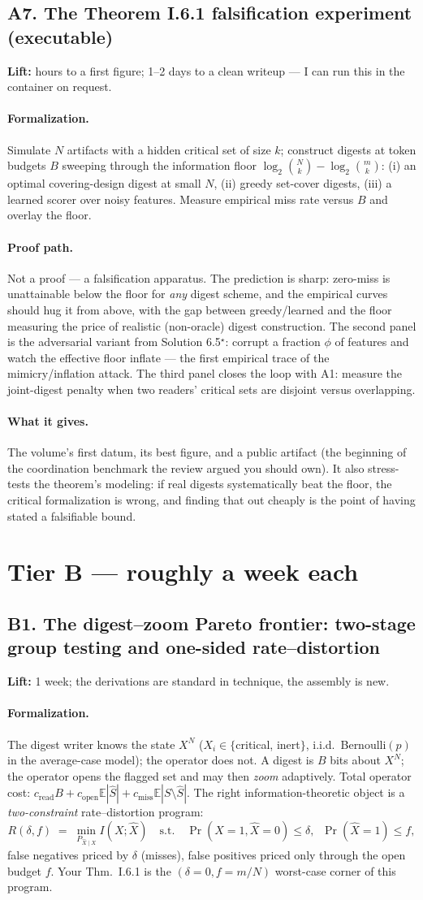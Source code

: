 \documentclass[11pt,a4paper]{article}
\newcommand{\lift}[1]{\noindent\textbf{Lift:} #1.}
\newcommand{\gives}{\paragraph{What it gives.}}
\newcommand{\form}{\paragraph{Formalization.}}
\newcommand{\proofpath}{\paragraph{Proof path.}}
\begin{document}
\subsection{A7. The Theorem I.6.1 falsification experiment (executable)}
\lift{hours to a first figure; 1--2 days to a clean writeup --- I can run this in the container on request}

\form Simulate $N$ artifacts with a hidden critical set of size $k$; construct digests at token budgets $B$ sweeping through the information floor $\log_2\binom{N}{k} - \log_2\binom{m}{k}$: (i) an optimal covering-design digest at small $N$, (ii) greedy set-cover digests, (iii) a learned scorer over noisy features. Measure empirical miss rate versus $B$ and overlay the floor.

\proofpath Not a proof --- a falsification apparatus. The prediction is sharp: zero-miss is unattainable below the floor for \emph{any} digest scheme, and the empirical curves should hug it from above, with the gap between greedy/learned and the floor measuring the price of realistic (non-oracle) digest construction. The second panel is the adversarial variant from Solution 6.5$^\star$: corrupt a fraction $\phi$ of features and watch the effective floor inflate --- the first empirical trace of the mimicry/inflation attack. The third panel closes the loop with A1: measure the joint-digest penalty when two readers' critical sets are disjoint versus overlapping.

\gives The volume's first datum, its best figure, and a public artifact (the beginning of the coordination benchmark the review argued you should own). It also stress-tests the theorem's modeling: if real digests systematically beat the floor, the critical formalization is wrong, and finding that out cheaply is the point of having stated a falsifiable bound.

\section{Tier B --- roughly a week each}

\subsection{B1. The digest--zoom Pareto frontier: two-stage group testing and one-sided rate--distortion}
\lift{1 week; the derivations are standard in technique, the assembly is new}

\form The digest writer knows the state $X^N$ ($X_i \in \{$critical, inert$\}$, i.i.d.\ Bernoulli$(p)$ in the average-case model); the operator does not. A digest is $B$ bits about $X^N$; the operator opens the flagged set and may then \emph{zoom} adaptively. Total operator cost: $c_{\mathrm{read}}B + c_{\mathrm{open}}\mathbb{E}|\hat S| + c_{\mathrm{miss}}\mathbb{E}|S\setminus\hat S|$. The right information-theoretic object is a \emph{two-constraint} rate--distortion program:
\[ R(\delta, f) \;=\; \min_{P_{\hat X\mid X}} I(X;\hat X) \quad \text{s.t.}\quad \Pr(X{=}1, \hat X{=}0) \le \delta,\;\; \Pr(\hat X{=}1) \le f, \]
false negatives priced by $\delta$ (misses), false positives priced only through the open budget $f$. Your Thm.~I.6.1 is the $(\delta{=}0, f{=}m/N)$ worst-case corner of this program.
\end{document}
